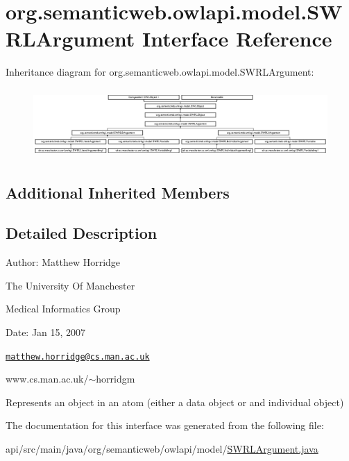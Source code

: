 \hypertarget{interfaceorg_1_1semanticweb_1_1owlapi_1_1model_1_1_s_w_r_l_argument}{\section{org.\-semanticweb.\-owlapi.\-model.\-S\-W\-R\-L\-Argument Interface Reference}
\label{interfaceorg_1_1semanticweb_1_1owlapi_1_1model_1_1_s_w_r_l_argument}
}
Inheritance diagram for org.\-semanticweb.\-owlapi.\-model.\-S\-W\-R\-L\-Argument\-:\begin{figure}[H]
\begin{center}
\leavevmode
\includegraphics[height=2.663043cm]{interfaceorg_1_1semanticweb_1_1owlapi_1_1model_1_1_s_w_r_l_argument}
\end{center}
\end{figure}
\subsection*{Additional Inherited Members}


\subsection{Detailed Description}
Author\-: Matthew Horridge\par
 The University Of Manchester\par
 Medical Informatics Group\par
 Date\-: Jan 15, 2007\par
\par
 

\href{mailto:matthew.horridge@cs.man.ac.uk}{\tt matthew.\-horridge@cs.\-man.\-ac.\-uk}\par
 www.\-cs.\-man.\-ac.\-uk/$\sim$horridgm\par
\par
 Represents an object in an atom (either a data object or and individual object) 

The documentation for this interface was generated from the following file\-:\begin{DoxyCompactItemize}
\item 
api/src/main/java/org/semanticweb/owlapi/model/\hyperlink{_s_w_r_l_argument_8java}{S\-W\-R\-L\-Argument.\-java}\end{DoxyCompactItemize}

